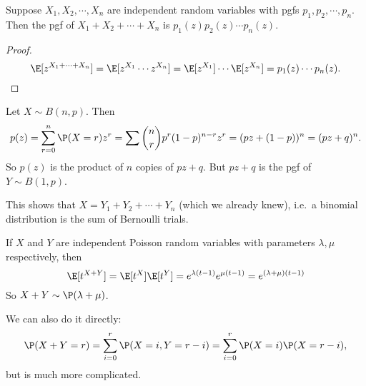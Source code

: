 \documentclass[a4paper]{article}
\begin{document}
\begin{thm}
  Suppose $X_1, X_2, \cdots, X_n$ are independent random variables with pgfs $p_1, p_2, \cdots, p_n$. Then the pgf of $X_1 + X_2 + \cdots + X_n$ is $p_1(z)p_2(z)\cdots p_n(z)$.
\end{thm}

\begin{proof}
  \[
    \E[z^{X_1 + \cdots + X_n}] = \E[z^{X_1}\cdots z^{X_n}] = \E[z^{X_1}]\cdots\E[z^{X_n}] = p_1(z)\cdots p_n(z).
  \]
\end{proof}

\begin{eg}
  Let $X\sim B(n, p)$. Then
  \[
    p(z) = \sum_{r = 0}^{n} \P(X = r)z^r = \sum \binom{n}{r} p^r(1 - p)^{n - r}z^r = (pz + (1 - p))^n = (pz + q)^n.
  \]
  So $p(z)$ is the product of $n$ copies of $pz + q$. But $pz + q$ is the pgf of $Y\sim B(1, p)$.

  This shows that $X = Y_1 + Y_2 + \cdots + Y_n$ (which we already knew), i.e.\ a binomial distribution is the sum of Bernoulli trials.
\end{eg}

\begin{eg}
  If $X$ and $Y$ are independent Poisson random variables with parameters $\lambda, \mu$ respectively, then
  \[
    \E[t^{X + Y}] = \E[t^X]\E[t^Y] = e^{\lambda(t - 1)}e^{\mu(t - 1)} = e^{(\lambda + \mu)(t - 1)}
  \]
  So $X + Y\sim \P(\lambda + \mu)$.

  We can also do it directly:
  \[
    \P(X + Y = r) = \sum_{i = 0}^r \P(X = i, Y = r - i) = \sum_{i = 0}^r \P(X = i)\P(X = r - i),
  \]
  but is much more complicated.
\end{eg}
\end{document}
